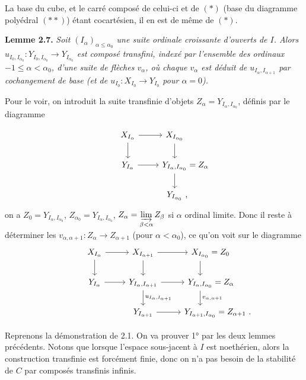\documentclass[11pt]{article}
\newcommand{\printedpage}[1]{\marginpar{\footnotesize p.~#1}}
\newcommand{\msp}[1]{\marginpar{\footnotesize [#1]}}
\begin{document}
La base du cube, et le carré
\msp{page 33}
composé de celui-ci et de $(*)$ (base du diagramme polyédral $(**)$) étant cocartésien, il en est de même de $(*)$.

\textbf{Lemme 2.7.} \textit{Soit $(I_\alpha)_{\alpha\leq\alpha_0}$ une suite ordinale croissante d'ouverts de $I$. Alors $u_{I_0,I_{\alpha_0}} : Y_{I_0,I_{\alpha_0}} \longrightarrow Y_{I_{\alpha_0}}$ est composé transfini, indexé par l'ensemble des ordinaux $-1 \leq \alpha < \alpha_0$, d'une suite de flèches $v_\alpha$, où chaque $v_\alpha$ est déduit de $u_{I_\alpha,I_{\alpha+1}}$ par cochangement de base (et de $u_{I_0} : X_{I_0} \longrightarrow Y_{I_0}$ pour $\alpha = 0$).}

Pour le voir, on introduit la suite transfinie d'objets $Z_\alpha = Y_{I_\alpha,I_{\alpha_0}}$, définis par le diagramme

\printedpage{19}

\[
\begin{tikzcd}
X_{I_\alpha} \arrow[r] \arrow[d] & X_{I_{\alpha_0}} \arrow[d] \\
Y_{I_\alpha} \arrow[r] & Y_{I_\alpha,I_{\alpha_0}} \rlap{${}= Z_\alpha$} \arrow[d] \\
& Y_{I_{\alpha_0}} \rlap{\ ,}
\end{tikzcd}
\]
on a $Z_0 = Y_{I_\alpha,I_{\alpha_0}}$, $Z_{\alpha_0} = Y_{I_\alpha,I_{\alpha_0}}$, $Z_\alpha = \varinjlim\limits_{\beta<\alpha} Z_\beta$ si $\alpha$ \msp{34} ordinal limite. Donc il reste à déterminer les $v_{\alpha,\alpha+1} : Z_\alpha \longrightarrow Z_{\alpha+1}$ (pour $\alpha < \alpha_0$), ce qu'on voit sur le diagramme
\[
\begin{tikzcd}
X_{I_\alpha} \arrow[r] \arrow[d] & X_{I_{\alpha+1}} \arrow[r] \arrow[d] & X_{I_{\alpha_0}} \rlap{${}= Z_0$} \arrow[d] \\
Y_{I_\alpha} \arrow[r] & Y_{I_\alpha,I_{\alpha+1}} \arrow[r] \arrow[d, "u_{I_\alpha,I_{\alpha+1}}"] & Y_{I_\alpha,I_{\alpha_0}} \rlap{${}= Z_\alpha$} \arrow[d, "v_{\alpha,\alpha+1}"] \\
& Y_{I_{\alpha+1}} \arrow[r] & Y_{I_{\alpha+1},I_{\alpha_0}} \rlap{${}= Z_{\alpha+1}\ .$}
\end{tikzcd}
\]

Reprenons la démonstration de 2.1. On va prouver 1° par les deux lemmes précédents. Notons que lorsque l'espace sous-jacent à $I$ est noethérien, alors la construction transfinie est forcément finie, donc on n'a pas besoin de la stabilité de $C$ par composés transfinis infinis.
\end{document}
